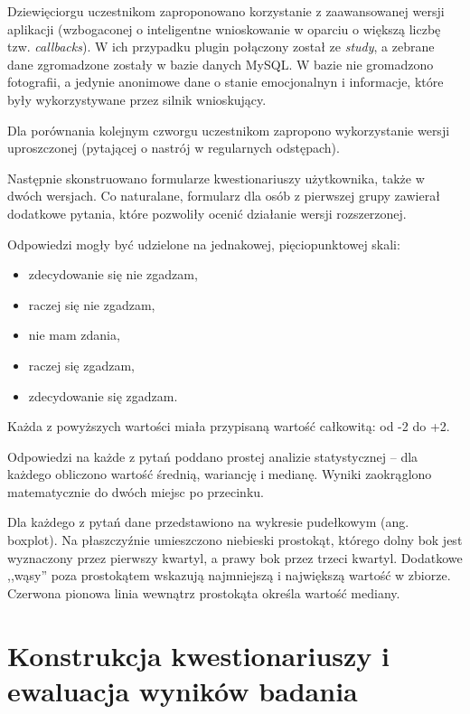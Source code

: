 Dziewięciorgu uczestnikom zaproponowano korzystanie z zaawansowanej wersji aplikacji (wzbogaconej o inteligentne wnioskowanie w oparciu o większą liczbę tzw. \textit{callbacks}). W ich przypadku plugin połączony został ze \textit{study}, a zebrane dane zgromadzone zostały w bazie danych MySQL. W bazie nie gromadzono fotografii, a jedynie anonimowe dane o stanie emocjonalnyn i informacje, które były wykorzystywane przez silnik wnioskujący.

Dla porównania kolejnym czworgu uczestnikom zapropono wykorzystanie wersji uproszczonej (pytającej o nastrój w regularnych odstępach).

Następnie skonstruowano formularze kwestionariuszy użytkownika, także w dwóch wersjach. Co naturalane, formularz dla osób z pierwszej grupy zawierał dodatkowe pytania, które pozwoliły ocenić działanie wersji rozszerzonej.

Odpowiedzi mogły być udzielone na jednakowej, pięciopunktowej skali:
\begin{itemize}
	\item zdecydowanie się nie zgadzam, 
	\item raczej się nie zgadzam,
	\item nie mam zdania,
	\item raczej się zgadzam,
	\item zdecydowanie się zgadzam.
\end{itemize}

Każda z powyższych wartości miała przypisaną wartość całkowitą: od -2 do +2.

Odpowiedzi na każde z pytań poddano prostej analizie statystycznej -- dla każdego obliczono wartość średnią, wariancję i medianę. Wyniki zaokrąglono matematycznie do dwóch miejsc po przecinku.

Dla każdego z pytań dane przedstawiono na wykresie pudełkowym (ang. boxplot). Na płaszczyźnie umieszczono niebieski prostokąt, którego dolny bok jest wyznaczony przez pierwszy kwartyl, a prawy bok przez trzeci kwartyl. Dodatkowe ,,wąsy'' poza prostokątem wskazują najmniejszą i największą wartość w zbiorze. Czerwona pionowa linia wewnątrz prostokąta określa wartość mediany.


\section{Konstrukcja kwestionariuszy i ewaluacja wyników badania}
\label{sec:konstrukcjaKwestionariuszyIEwaluacjaWynikowBadania}


